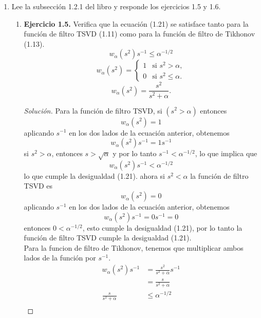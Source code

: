 \documentclass[12pt,spanish,mexico]{article}
\numberwithin{equation}{section}
\theoremstyle{definition}
\theoremstyle{remark}
\newenvironment{solution}{\begin{proof}[Solución]}{\end{proof}}
\begin{document}
\begin{enumerate}[label=(\alph*)]
    \item Lee la subsección 1.2.1 del libro y responde los ejercicios 1.5 y 1.6.
    \begin{enumerate}
        \item \textbf{Ejercicio 1.5.} Verifica que la ecuación (1.21) se satisface tanto para la función de filtro TSVD (1.11) como para la función de filtro de Tikhonov (1.13).
        \begin{equation}
        w_\alpha(s^2)s^{-1} \leq \alpha^{-1/2}
        \tag{1.21}
        \end{equation}
        \begin{equation}
        w_\alpha(s^2)=\begin{cases}
            1 & \text{si } s^2 > \alpha,\\
            0 & \text{si } s^2 \leq \alpha.
        \end{cases}
        \tag{1.11}
        \end{equation}
        \begin{equation}
            w_\alpha(s^2) =\frac{s^2}{s^2+\alpha}.
            \tag{1.13}
        \end{equation}
        \begin{solution}
            Para la función de filtro TSVD, si $(s^2 > \alpha)$ entonces
            $$w_\alpha(s^2)=1$$
            aplicando $s^{-1}$ en los dos lados de la ecuación anterior, obtenemos
            $$w_\alpha(s^2)s^{-1} =1 s^{-1}$$
            si $s^2 > \alpha$, entonces $s> \sqrt{\alpha}$ y por lo tanto $s^{-1} < \alpha^{-1/2}$, lo que implica que
            $$w_\alpha(s^2)s^{-1}< \alpha^{-1/2}$$
            lo que cumple la desigualdad (1.21).
            ahora si $s^2 < \alpha$ la función de filtro TSVD es
            $$w_\alpha(s^2)=0$$
            aplicando $s^{-1}$ en los dos lados de la ecuación anterior, obtenemos
            $$w_\alpha(s^2)s^{-1} =0 s^{-1}=0$$
            entonces $0<\alpha^{-1/2}$, esto cumple la desigualdad (1.21), por lo tanto la función de filtro TSVD cumple
            la desigualdad (1.21).\\
            Para la funcion de filtro de Tikhonov, tenemos que multiplicar ambos lados de la función  por $s^{-1}$.
            \begin{align*}
            w_\alpha(s^2)s^{-1} &=\frac{s^2}{s^2+\alpha}s^{-1}\\
            &=\frac{s}{s^2+\alpha}\\
            \frac{s}{s^2+\alpha} &\leq \alpha^{-1/2} \\

\end{align*}
\end{solution}
\end{enumerate}
\end{enumerate}
\end{document}

